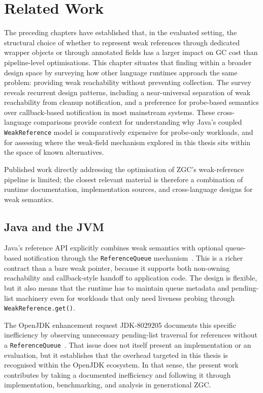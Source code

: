 \chapter{Related Work}
\label{chap:related-work}

The preceding chapters have established that, in the evaluated setting, the structural choice of whether to represent weak references through dedicated wrapper objects or through annotated fields has a larger impact on \ac{GC} cost than pipeline-level optimisations. This chapter situates that finding within a broader design space by surveying how other language runtimes approach the same problem: providing weak reachability without preventing collection. The survey reveals recurrent design patterns, including a near-universal separation of weak reachability from cleanup notification, and a preference for probe-based semantics over callback-based notification in most mainstream systems. These cross-language comparisons provide context for understanding why Java's coupled \texttt{WeakReference} model is comparatively expensive for probe-only workloads, and for assessing where the weak-field mechanism explored in this thesis sits within the space of known alternatives.

Published work directly addressing the optimisation of \ac{ZGC}'s weak-reference pipeline is limited; the closest relevant material is therefore a combination of runtime documentation, implementation sources, and cross-language designs for weak semantics.

\section{Java and the JVM}
\label{sec:rw-java}

Java's reference \ac{API} explicitly combines weak semantics with optional queue-based notification through the \texttt{ReferenceQueue} mechanism~\cite{oracle-ref-javadoc,openjdk-reference-java,openjdk-referencequeue-java}. This is a richer contract than a bare weak pointer, because it supports both non-owning reachability and callback-style handoff to application code. The design is flexible, but it also means that the runtime has to maintain queue metadata and pending-list machinery even for workloads that only need liveness probing through \texttt{WeakReference.get()}.

The OpenJDK enhancement request JDK-8029205 documents this specific inefficiency by observing unnecessary pending-list traversal for references without a \texttt{ReferenceQueue}~\cite{JDK-8029205}. That issue does not itself present an implementation or an evaluation, but it establishes that the overhead targeted in this thesis is recognised within the OpenJDK ecosystem. In that sense, the present work contributes by taking a documented inefficiency and following it through implementation, benchmarking, and analysis in generational \ac{ZGC}.

